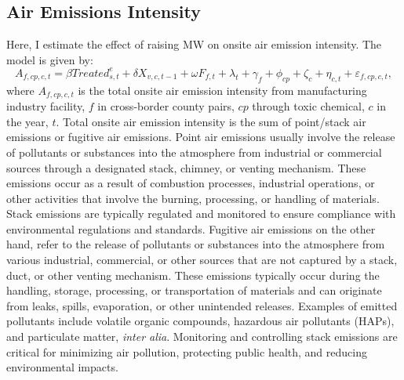 \documentclass[12pt, english]{article}
\begin{document}
    \subsection{Air Emissions Intensity}\label{subsec:air-emission-intensity}
    Here, I estimate the effect of raising MW on onsite air emission intensity. The model is given by:
    \begin{equation}
        A_{f,cp,c,t} = \beta Treated_{s,t}^e + \delta X_{v,c,t-1} + \omega F_{f,t} + \lambda_{t} + \gamma_{f} + \phi_{cp} + \zeta_{c} + \eta_{c,t} + \varepsilon_{f,cp,c,t},\label{eq:baseline-onsite-air-emission-intensity}
    \end{equation}
    where $A_{f,cp,c,t}$ is the total onsite air emission intensity from manufacturing industry facility, $f$ in cross-border county pairs, $cp$ through toxic chemical, $c$ in the year, $t$. Total onsite air emission intensity is the sum of point/stack air emissions or fugitive air emissions. Point air emissions usually involve the release of pollutants or substances into the atmosphere from industrial or commercial sources through a designated stack, chimney, or venting mechanism. These emissions occur as a result of combustion processes, industrial operations, or other activities that involve the burning, processing, or handling of materials. Stack emissions are typically regulated and monitored to ensure compliance with environmental regulations and standards. Fugitive air emissions on the other hand, refer to the release of pollutants or substances into the atmosphere from various industrial, commercial, or other sources that are not captured by a stack, duct, or other venting mechanism. These emissions typically occur during the handling, storage, processing, or transportation of materials and can originate from leaks, spills, evaporation, or other unintended releases. Examples of emitted pollutants include volatile organic compounds, hazardous air pollutants (HAPs), and particulate matter, \textit{inter alia}. Monitoring and controlling stack emissions are critical for minimizing air pollution, protecting public health, and reducing environmental impacts.
    
\end{document}
